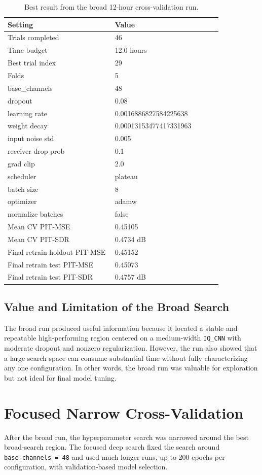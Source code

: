 \documentclass[11pt]{article}
\begin{document}
\begin{table}[htbp]
\centering
\caption{Best result from the broad 12-hour cross-validation run.}
\label{tab:broadcv}
\begin{tabular}{p{0.42\linewidth}p{0.42\linewidth}}
\hline
Setting & Value \\
\hline
Trials completed & 46 \\
Time budget & 12.0 hours \\
Best trial index & 29 \\
Folds & 5 \\
base\_channels & 48 \\
dropout & 0.08 \\
learning rate & 0.0016886827584225638 \\
weight decay & 0.00013153477417331963 \\
input noise std & 0.005 \\
receiver drop prob & 0.1 \\
grad clip & 2.0 \\
scheduler & plateau \\
batch size & 8 \\
optimizer & adamw \\
normalize batches & false \\
Mean CV PIT-MSE & 0.45105 \\
Mean CV PIT-SDR & 0.4734 dB \\
Final retrain holdout PIT-MSE & 0.45152 \\
Final retrain test PIT-MSE & 0.45073 \\
Final retrain test PIT-SDR & 0.4757 dB \\
\hline
\end{tabular}
\end{table}

\subsection{Value and Limitation of the Broad Search}
The broad run produced useful information because it located a stable and repeatable high-performing region centered on a medium-width \texttt{IQ\_CNN} with moderate dropout and nonzero regularization. However, the run also showed that a large search space can consume substantial time without fully characterizing any one configuration. In other words, the broad run was valuable for exploration but not ideal for final model tuning.

\section{Focused Narrow Cross-Validation}
After the broad run, the hyperparameter search was narrowed around the best broad-search region. The focused deep search fixed the search around \texttt{base\_channels = 48} and used much longer runs, up to 200 epochs per configuration, with validation-based model selection.
\end{document}
